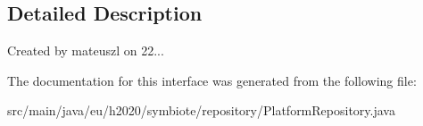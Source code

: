 \subsection{Detailed Description}
Created by mateuszl on 22... 

The documentation for this interface was generated from the following file\+:\begin{DoxyCompactItemize}
\item 
src/main/java/eu/h2020/symbiote/repository/Platform\+Repository.\+java\end{DoxyCompactItemize}
